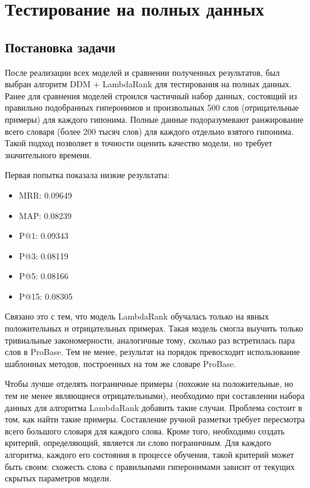 \section{Тестирование на полных данных}
\label{sec:Chapter_5} 
\large

\subsection{Постановка задачи}

После реализации всех моделей и сравнении полученных результатов, был выбран алгоритм DDM + LambdaRank для тестирования на полных данных. Ранее для сравнения моделей строился частичный набор данных, состоящий из правильно подобранных гиперонимов и произвольных 500 слов (отрицательные примеры) для каждого гипонима. Полные данные подоразумевают ранжирование всего словаря (более 200 тысяч слов) для каждого отдельно взятого гипонима. Такой подход позволяет в точности оценить качество модели, но требует значительного времени. 

Первая попытка показала низкие результаты:
\begin{itemize}
\item MRR: 0.09649
\item MAP: 0.08239
\item P@1: 0.09343
\item P@3: 0.08119
\item P@5: 0.08166
\item P@15: 0.08305
\end{itemize}

Связано это с тем, что модель LambdaRank обучалась только на явных положительных и отрицательных примерах. Такая модель смогла выучить только тривиальные закономерности, аналогичные тому, сколько раз встретилась пара слов в ProBase. Тем не менее, результат на порядок превосходит использование шаблонных методов, построенных на том же словаре ProBase. 

Чтобы лучше отделять пограничные примеры (похожие на положительные, но тем не менее являющиеся отрицательными), необходимо при составлении набора данных для алгоритма LambdaRank добавить такие случаи. Проблема состоит в том, как найти такие примеры. Составление ручной разметки требует пересмотра всего большого словаря для каждого слова. Кроме того, необходимо создать критерий, определяющий, является ли слово пограничным. Для каждого алгоритма, каждого его состояния в процессе обучения, такой критерий может быть своим: схожесть слова с правильными гиперонимами зависит от текущих скрытых параметров модели. 

